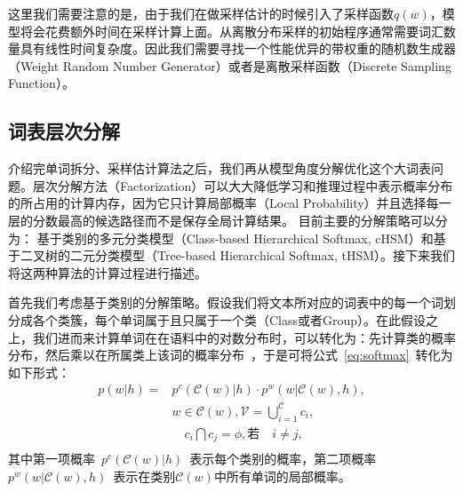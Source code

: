 这里我们需要注意的是，由于我们在做采样估计的时候引入了采样函数$q(w)$，模型将会花费额外时间在采样计算上面。从离散分布采样的初始程序通常需要词汇数量具有线性时间复杂度。因此我们需要寻找一个性能优异的带权重的随机数生成器（Weight Random Number Generator）或者是离散采样函数（Discrete Sampling Function）。


\subsection{词表层次分解}
介绍完单词拆分、采样估计算法之后，我们再从模型角度分解优化这个大词表问题。层次分解方法（Factorization）可以大大降低学习和推理过程中表示概率分布的所占用的计算内存，因为它只计算局部概率（Local Probability）并且选择每一层的分数最高的候选路径而不是保存全局计算结果。
目前主要的分解策略可以分为： 基于类别的多元分类模型（Class-based Hierarchical Softmax, cHSM）和基于二叉树的二元分类模型（Tree-based Hierarchical Softmax, tHSM）。接下来我们将这两种算法的计算过程进行描述。

首先我们考虑基于类别的分解策略。假设我们将文本所对应的词表中的每一个词划分成各个类簇，每个单词属于且只属于一个类（Class或者Group）。在此假设之上，我们进而来计算单词在在语料中的对数分布时，可以转化为：先计算类的概率分布，然后乘以在所属类上该词的概率分布~，于是可将公式~\ref{eq:softmax}~转化为如下形式：
\begin{equation}
\begin{split}
p(w|h)=&p^c(\mathcal{C}(w)|h)\cdot p^w(w|\mathcal{C}(w),h) ,\\
 & w\in \mathcal{C}(w),\mathcal{V}=\bigcup _{i = 1}^\mathcal{C}{c_i},\\
 & \quad  c_i \bigcap c_j=\phi, \text{若}\quad i\ne j, \\
\end{split}
\end{equation}
其中第一项概率~$p^c(\mathcal{C}(w)|h)$~表示每个类别的概率，第二项概率~$p^w(w|\mathcal{C}(w),h)$~表示在类别$\mathcal{C}(w)$中所有单词的局部概率。

